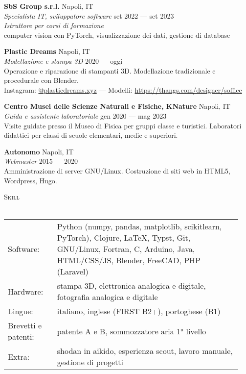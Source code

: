 \documentclass[a4paper]{article}
\newcommand{\lineunder} {
  \vspace*{-8pt} \\
  \hspace*{-18pt} \hrulefill \\
}
\newcommand{\header} [1] {
  {\hspace*{-18pt}\vspace*{6pt} \textsc{#1}}
  \vspace*{-6pt} \lineunder
}
\begin{document}
\textbf{SbS Group s.r.l.} \hfill Napoli, IT \\
\textit{Specialista IT, sviluppatore software} \hfill set 2022 --- set 2023 \\
\textit{Istruttore per corsi di formazione} \\
computer vision con PyTorch, visualizzazione dei dati, gestione di database
\vspace{5mm}

\textbf{Plastic Dreams} \hfill Napoli, IT \\
\textit{Modellazione e stampa 3D} \hfill 2020 --- oggi \\
Operazione e riparazione di stampanti 3D. Modellazione tradizionale e procedurale con Blender. \\
Instagram: \href{https://www.instagram.com/plasticdreams.xyz/}{@plasticdreams.xyz}
--- Modelli: \url{https://thangs.com/designer/soffice}
\vspace{5mm}

\textbf{Centro Musei delle Scienze Naturali e Fisiche, KNature} \hfill Napoli, IT \\
\textit{Guida e assistente laboratoriale} \hfill gen 2020 --- mag 2023 \\
Visite guidate presso il Museo di Fisica per gruppi classe e turistici.
Laboratori didattici per classi di scuole elementari, medie e superiori.
\vspace{5mm}

\textbf{Autonomo} \hfill Napoli, IT \\
\textit{Webmaster}
\hfill 2015 --- 2020\\
Amministrazione di server GNU/Linux.
Costruzione di siti web in HTML5, Wordpress, Hugo. \\
\vspace{2mm}

\header{Skill}
\vspace{1mm}

\begin{tabular}{ p{0.2\linewidth} p{0.75\linewidth} }
  Software: & Python (numpy, pandas, matplotlib, scikitlearn, PyTorch),
              Clojure, LaTeX, Typst, Git, GNU/Linux, Fortran,
              C, Arduino, Java, HTML/CSS/JS,
              Blender, FreeCAD, PHP (Laravel) \\
  Hardware: & stampa 3D,
              elettronica analogica e digitale,
              fotografia analogica e digitale \\
  Lingue:   & italiano,
              inglese (FIRST B2+),
              portoghese (B1) \\
  Brevetti e patenti: & patente A e B,
                        sommozzatore aria 1° livello \\
  Extra: & shodan in aikido,
           esperienza scout,
           lavoro manuale,
           gestione di progetti
\end{tabular}
\vspace{2mm}
\end{document}
